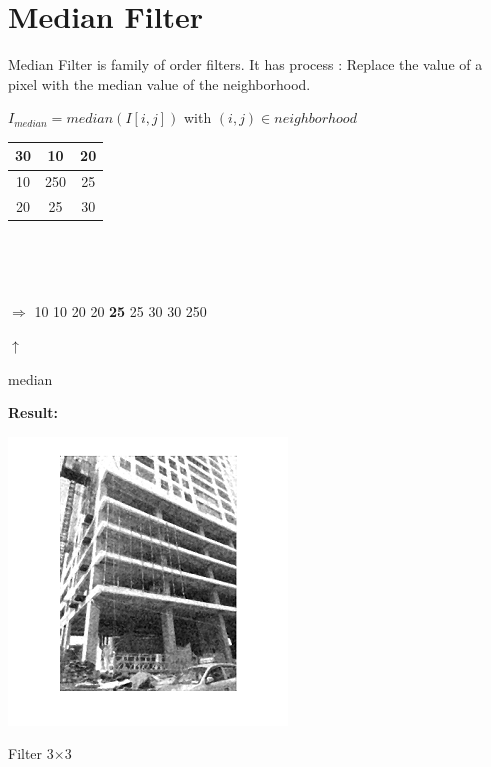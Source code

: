 \section{Median Filter}
Median Filter is family of order filters. It has process : Replace the value of a pixel with the median value of the neighborhood.

$I_{median} = median(I[i,j])$  with $(i,j)\in neighborhood$
\vspace{2cm}
\begin{center}
	

\begin{tabular}{|c|c|c|}  
	\hline 
	30 & 10 & 20 \\ 
	\hline                    
	10 & 250 & 25 \\ 
	\hline 
	20 & 25 & 30 \\ 
	\hline 
\end{tabular} 
\end{center}
\

\



$\Rightarrow$ 10 10 20 20 \textbf{25} 25 30 30 250 

\hspace{26mm}$\uparrow$

\hspace{20mm} median

\newpage
\textbf{Result:}
\vspace{2cm}

\begin{center}
	\includegraphics{medianc3.png}
	
	Filter 3$\times$3
\end{center}

